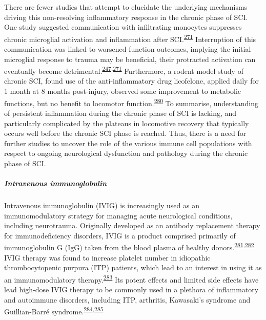 \documentclass[
]{article}
\begin{document}
There are fewer studies that attempt to elucidate the underlying mechanisms driving this non-resolving inflammatory response in the chronic phase of SCI.
One study suggested communication with infiltrating monocytes suppresses chronic microglial activation and inflammation after SCI.\textsuperscript{\protect\hyperlink{ref-greenhalgh_peripherally_2018}{271}}
Interruption of this communication was linked to worsened function outcomes, implying the initial microglial response to trauma may be beneficial, their protracted activation can eventually become detrimental.\textsuperscript{\protect\hyperlink{ref-bellver-landete_microglia_2019}{247},\protect\hyperlink{ref-greenhalgh_peripherally_2018}{271}}
Furthermore, a rodent model study of chronic SCI, found use of the anti-inflammatory drug licofelone, applied daily for 1 month at 8 months post-injury, observed some improvement to metabolic functions, but no benefit to locomotor function.\textsuperscript{\protect\hyperlink{ref-dulin_licofelone_2013}{280}}
To summarise, understanding of persistent inflammation during the chronic phase of SCI is lacking, and particularly complicated by the plateaus in locomotive recovery that typically occurs well before the chronic SCI phase is reached.
Thus, there is a need for further studies to uncover the role of the various immune cell populations with respect to ongoing neurological dysfunction and pathology during the chronic phase of SCI.

\hypertarget{intravenous-immunoglobulin}{%
\subparagraph{Intravenous immunoglobulin}\label{intravenous-immunoglobulin}}

Intravenous immunoglobulin (IVIG) is increasingly used as an immunomodulatory strategy for managing acute neurological conditions, including neurotrauma.
Originally developed as an antibody replacement therapy for immunodeficiency disorders, IVIG is a product comprised primarily of immunoglobulin G (IgG) taken from the blood plasma of healthy donors.\textsuperscript{\protect\hyperlink{ref-bayry_intravenous_2011}{281},\protect\hyperlink{ref-schwab_intravenous_2013}{282}}
IVIG therapy was found to increase platelet number in idiopathic thrombocytopenic purpura (ITP) patients, which lead to an interest in using it as an immunomodulatory therapy.\textsuperscript{\protect\hyperlink{ref-imbach_high-dose_1981}{283}}
Its potent effects and limited side effects have lead high-dose IVIG therapy to be commonly used in a plethora of inflammatory and autoimmune disorders, including ITP, arthritis, Kawasaki's syndrome and Guillian-Barré syndrome.\textsuperscript{\protect\hyperlink{ref-lunemann_intravenous_2015}{284},\protect\hyperlink{ref-stangel_intravenous_1998}{285}}
\end{document}
